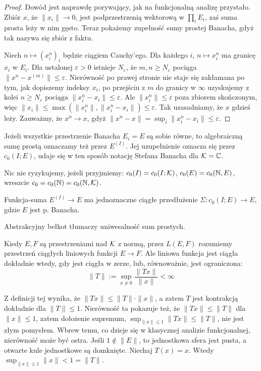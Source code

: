 \begin{proof}
Dowód jest naprawdę porywający, jak na funkcjonalną analizę przystało.
Zbiór $x$, że $\|x_i\| \to 0$, jest podprzestrzenią wektorową w $\prod_i E_i$, zaś suma prosta leży w nim gęsto.
Teraz pokażemy zupełność sumy prostej Banacha, gdyż tak nazywa się zbiór z faktu.

Niech $n \mapsto (x_i^{n})_i$ będzie ciągiem Cauchy'ego.
Dla każdego $i$, $n \mapsto x_i^{n}$ ma granicę $x_i$ w $E_i$.
Dla ustalonej $\varepsilon > 0$ istnieje $N_\varepsilon$, że
$m, n \ge N_\varepsilon$ pociąga $\|x^{n} - x^{(m)}\| \le \varepsilon$.
Nierówność po prawej stronie nie staje się zakłamana po tym, jak dopiszemy indeksy $x_i$, po przejściu z $m$ do granicy w $\infty$ uzyskujemy z kolei $n \ge N_\varepsilon \textrm{ pociąga } \|x_i^{n} - x_i\| \le \varepsilon$.
Ale $\|x_i^{n}\| \le \varepsilon$ poza zbiorem skończonym, więc $\|x_i\| \le \max (\|x_i^{n}\|, \|x_i^{n} - x_i\|) \le \varepsilon$.
Tak uzasadniamy, że $x$ gdzieś leży.
Zauważmy, że $x^{n} \to x$, gdyż $\|x^{n} -x\| = \sup_i \|x^n_i -x_i\| \le \varepsilon$.
\end{proof}

Jeżeli wszystkie przestrzenie Banacha $E_i = E$ są sobie równe, to algebraiczną sumę prostą oznaczamy też przez $E^{(I)}$.
Jej uzupełnienie oznacza się przez $c_0(I; E)$, udaje się w ten sposób notację Stefana Banacha dla $\mathcal K = \mathbb C$.

Nic nie ryzykujemy, jeżeli przyjmiemy: $c_0(I) = c_0(I; \mathcal K)$, $c_0(E) = c_0(\mathbb N, E)$, wreszcie $c_0 = c_0(\mathbb N) = c_0(\mathbb N, \mathcal K)$.

\begin{wniosek}
	Funkcja-suma $E^{(I)} \to E$ ma jednoznaczne ciągłe przedłużenie $\Sigma \colon c_0(I; E) \to E$, gdzie $E$ jest p. Banacha.
\end{wniosek}

Abstrakcyjny bełkot tłumaczy uniwesalność sum prostych.

Kiedy  $E, F$ są przestrzeniami nad $\mathcal K$ z normą, przez $L(E, F)$ rozumiemy przestrzeń ciągłych liniowych funkcji $E \to F$.
Ale liniowa funkcja jest ciągła dokładnie wtedy, gdy jest ciągła w zerze, lub, równoważnie, jest ograniczona:
\[
	\|T\| := \sup_{x \neq 0} \frac{\|T x\|}{\|x\|} < \infty
\]

Z definicji tej wynika, że $\|Tx\| \le \|T\| \cdot \|x\|$, a zatem $T$ jest kontrakcją dokładnie dla $\|T\| \le 1$.
Nierówność ta pokazuje też, że $\|Tx\| \le \|T\|$ dla $\|x\| \le 1$, zatem dołożenie supremum, $\sup_{\|x\| \le 1} \|Tx\| \le \|T\|$, nie jest złym pomysłem.
Wbrew temu, co dzieje się w klasycznej analizie funkcjonalnej, nierówność może być ostra.
Jeśli $1 \not \in \|E\|$, to jednostkowa sfera jest pusta, a otwarte kule jednostkowe są domknięte.
Niechaj $T(x) = x$. Wtedy $\sup_{\|x\| \le 1}\|x\| < 1 = \|T\|$.

